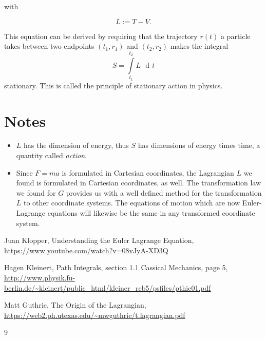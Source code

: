 \documentclass{article}
\DeclareMathOperator{\dd}{\!d\!}
\begin{document}
with

\begin{equation}
 L := T-V.
\end{equation}



This equation can be derived by requiring that the trajectory $r(t)$ a particle takes between two endpoints $(t_1,r_1)$ and $(t_2,r_2)$ makes the integral 
\begin{equation}
S=\int\limits_{t_1}^{t_2} L \; \dd t
\end{equation}
stationary. This is called the principle of stationary action in physics. \\

\section{Notes}
\begin{itemize}
\item $L$ has the dimension of energy, thus $S$ has dimensions of energy times time, a quantity called \emph{action}.
\item Since $F=ma$ is formulated in Cartesian coordinates, the Lagrangian $L$ we found is formulated in Cartesian coordinates, as well. The transformation law we found for $G$ provides us with a well defined method for the transformation $L$ to other coordinate systems. The equations of motion which are now Euler-Lagrange equations will likewise be the same in any transformed coordinate system.
\end{itemize}


\begin{thebibliography}{9}

 Juan Klopper, Understanding the Euler Lagrange Equation, \url{https://www.youtube.com/watch?v=08vJyA-XD3Q}

 Hagen Kleinert, Path Integrals, section 1.1 Cassical Mechanics, page 5, \url{http://www.physik.fu-berlin.de/~kleinert/public_html/kleiner_reb5/psfiles/pthic01.pdf}

 Matt Guthrie, The Origin of the Lagrangian, \url{https://web2.ph.utexas.edu/~mwguthrie/t.lagrangian.pdf}

\end{thebibliography}{9}
\end{document}
